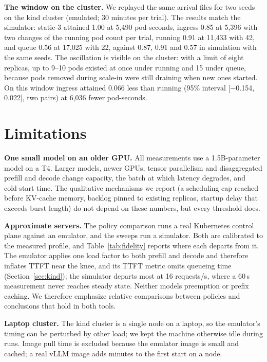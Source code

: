 \documentclass[10pt,conference]{IEEEtran}
\begin{document}
\textbf{The window on the cluster.}
We replayed the same arrival files for two seeds on the kind cluster
(emulated; 30 minutes per trial). The results match the simulator: static-3
attained 1.00 at 5{,}490 pod-seconds, ingress 0.85 at 5{,}396 with two
changes of the running pod count per trial, running 0.91 at 11{,}433 with 42,
and queue 0.56 at 17{,}025 with 22, against 0.87, 0.91 and 0.57 in
simulation with the same seeds. The oscillation is visible on the cluster:
with a limit of eight replicas, up to 9--10 pods existed at once under
running and 15 under queue, because pods removed during scale-in were still
draining when new ones started. On this window ingress attained 0.066 less than
running (95\% interval [$-$0.154, 0.022], two pairs) at 6{,}036 fewer
pod-seconds.

\section{Limitations}
\label{sec:limits}
\textbf{One small model on an older GPU.} All measurements use a 1.5B-parameter
model on a T4. Larger models, newer GPUs, tensor parallelism and
disaggregated prefill and decode change capacity, the batch at which latency
degrades, and cold-start time. The qualitative mechanisms we report (a
scheduling cap reached before KV-cache memory, backlog pinned to existing
replicas, startup delay that exceeds burst length) do not depend on these
numbers, but every threshold does.

\textbf{Approximate servers.} The policy comparison runs a real Kubernetes
control plane against an emulator, and the sweeps run a simulator. Both are
calibrated to the measured profile, and Table~\ref{tab:fidelity} reports where
each departs from it. The emulator applies one load factor to both prefill and
decode and therefore inflates TTFT near the knee, and its TTFT metric omits
queueing time (Section~\ref{sec:kind}); the simulator departs most at
16 requests/s, where a 60\,s measurement never reaches steady state. Neither
models preemption or prefix caching. We therefore emphasize relative
comparisons between policies and conclusions that hold in both tools.

\textbf{Laptop cluster.} The kind cluster is a single node on a laptop, so the
emulator's timing can be perturbed by other load; we kept the machine otherwise
idle during runs. Image pull time is excluded because the emulator image is
small and cached; a real vLLM image adds minutes to the first start on a node.
\end{document}
